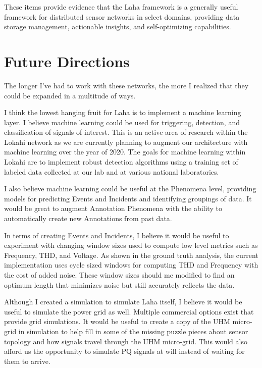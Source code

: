 These items provide evidence that the Laha framework is a generally useful framework for distributed sensor networks in select domains, providing data storage management, actionable insights, and self-optimizing capabilities.

\section{Future Directions}\label{sec:future-directions}

The longer I've had to work with these networks, the more I realized that they could be expanded in a multitude of ways.

I think the lowest hanging fruit for Laha is to implement a machine learning layer. I believe machine learning could be used for triggering, detection, and classification of signals of interest. This is an active area of research within the Lokahi network as we are currently planning to augment our architecture with machine learning over the year of 2020. The goals for machine learning within Lokahi are to implement robust detection algorithms using a training set of labeled data collected at our lab and at various national laboratories.

I also believe machine learning could be useful at the Phenomena level, providing models for predicting Events and Incidents and identifying groupings of data. It would be great to augment Annotation Phenomena with the ability to automatically create new Annotations from past data.

In terms of creating Events and Incidents, I believe it would be useful to experiment with changing window sizes used to compute low level metrics such as Frequency, THD, and Voltage. As shown in the ground truth analysis, the current implementation uses cycle sized windows for computing THD and Frequency with the cost of added noise. These window sizes should me modified to find an optimum length that minimizes noise but still accurately reflects the data.

Although I created a simulation to simulate Laha itself, I believe it would be useful to simulate the power grid as well. Multiple commercial options exist that provide grid simulations. It would be useful to create a copy of the UHM micro-grid in simulation to help fill in some of the missing puzzle pieces about sensor topology and how signals travel through the UHM micro-grid. This would also afford us the opportunity to simulate PQ signals at will instead of waiting for them to arrive.

